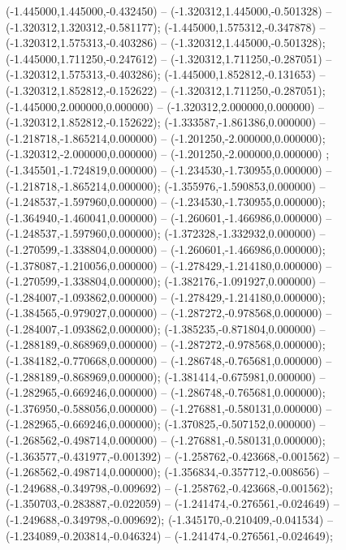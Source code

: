  (-1.445000,1.445000,-0.432450) -- (-1.320312,1.445000,-0.501328) -- (-1.320312,1.320312,-0.581177);
 (-1.445000,1.575312,-0.347878) -- (-1.320312,1.575313,-0.403286) -- (-1.320312,1.445000,-0.501328);
 (-1.445000,1.711250,-0.247612) -- (-1.320312,1.711250,-0.287051) -- (-1.320312,1.575313,-0.403286);
 (-1.445000,1.852812,-0.131653) -- (-1.320312,1.852812,-0.152622) -- (-1.320312,1.711250,-0.287051);
 (-1.445000,2.000000,0.000000) -- (-1.320312,2.000000,0.000000) -- (-1.320312,1.852812,-0.152622);
 (-1.333587,-1.861386,0.000000) -- (-1.218718,-1.865214,0.000000) -- (-1.201250,-2.000000,0.000000);
 (-1.320312,-2.000000,0.000000) -- (-1.201250,-2.000000,0.000000) ;
 (-1.345501,-1.724819,0.000000) -- (-1.234530,-1.730955,0.000000) -- (-1.218718,-1.865214,0.000000);
 (-1.355976,-1.590853,0.000000) -- (-1.248537,-1.597960,0.000000) -- (-1.234530,-1.730955,0.000000);
 (-1.364940,-1.460041,0.000000) -- (-1.260601,-1.466986,0.000000) -- (-1.248537,-1.597960,0.000000);
 (-1.372328,-1.332932,0.000000) -- (-1.270599,-1.338804,0.000000) -- (-1.260601,-1.466986,0.000000);
 (-1.378087,-1.210056,0.000000) -- (-1.278429,-1.214180,0.000000) -- (-1.270599,-1.338804,0.000000);
 (-1.382176,-1.091927,0.000000) -- (-1.284007,-1.093862,0.000000) -- (-1.278429,-1.214180,0.000000);
 (-1.384565,-0.979027,0.000000) -- (-1.287272,-0.978568,0.000000) -- (-1.284007,-1.093862,0.000000);
 (-1.385235,-0.871804,0.000000) -- (-1.288189,-0.868969,0.000000) -- (-1.287272,-0.978568,0.000000);
 (-1.384182,-0.770668,0.000000) -- (-1.286748,-0.765681,0.000000) -- (-1.288189,-0.868969,0.000000);
 (-1.381414,-0.675981,0.000000) -- (-1.282965,-0.669246,0.000000) -- (-1.286748,-0.765681,0.000000);
 (-1.376950,-0.588056,0.000000) -- (-1.276881,-0.580131,0.000000) -- (-1.282965,-0.669246,0.000000);
 (-1.370825,-0.507152,0.000000) -- (-1.268562,-0.498714,0.000000) -- (-1.276881,-0.580131,0.000000);
 (-1.363577,-0.431977,-0.001392) -- (-1.258762,-0.423668,-0.001562) -- (-1.268562,-0.498714,0.000000);
 (-1.356834,-0.357712,-0.008656) -- (-1.249688,-0.349798,-0.009692) -- (-1.258762,-0.423668,-0.001562);
 (-1.350703,-0.283887,-0.022059) -- (-1.241474,-0.276561,-0.024649) -- (-1.249688,-0.349798,-0.009692);
 (-1.345170,-0.210409,-0.041534) -- (-1.234089,-0.203814,-0.046324) -- (-1.241474,-0.276561,-0.024649);
